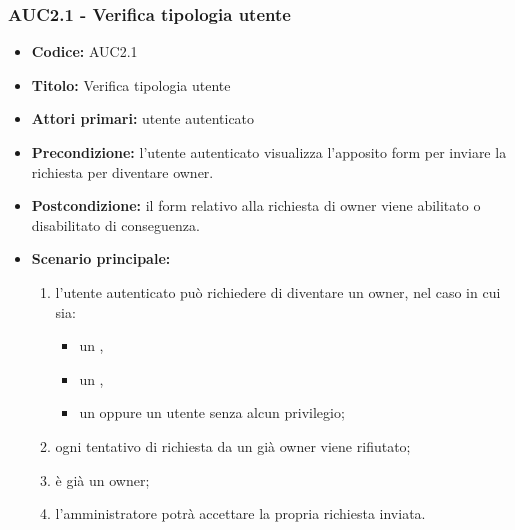 \documentclass[casi-duso]{subfiles}
\begin{document}
\subsubsection{AUC2.1 - Verifica tipologia utente}%
\label{subsub:AUC2.1}
\begin{itemize}
  \item \textbf{Codice:} AUC2.1
  \item \textbf{Titolo:} Verifica tipologia utente
  \item \textbf{Attori primari:} utente autenticato
  \item \textbf{Precondizione:} l'utente autenticato visualizza l'apposito form per inviare la richiesta per diventare owner.
  \item \textbf{Postcondizione:} il form relativo alla richiesta di owner viene abilitato o disabilitato di conseguenza.
  \item \textbf{Scenario principale:}
  \begin{enumerate}
    \item l'utente autenticato può richiedere di diventare un owner, nel caso in cui sia:
    \begin{itemize}
      \item un ,
      \item un ,
      \item un  oppure un utente senza alcun privilegio;
    \end{itemize}
    \item ogni tentativo di richiesta da un già owner viene rifiutato;
    \item {} è già un owner;
    \item l'amministratore potrà accettare la propria richiesta inviata.
  \end{enumerate}
\end{itemize}
\end{document}
